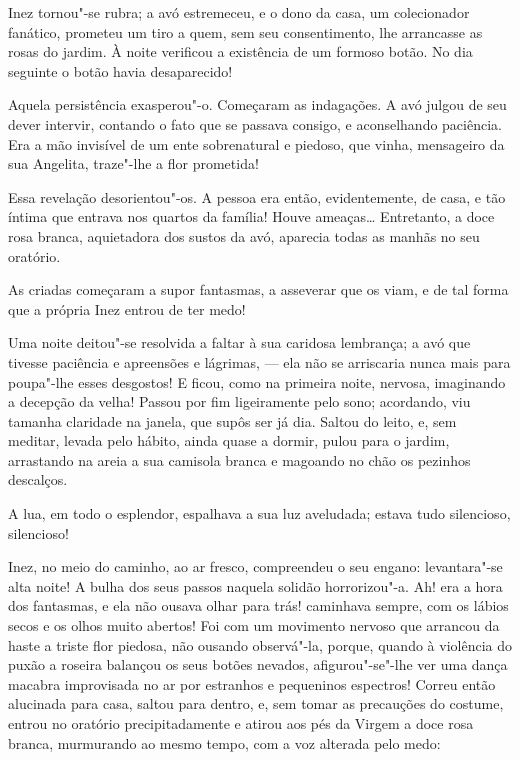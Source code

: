 Inez tornou"-se rubra; a avó estremeceu, e o dono da casa, um
colecionador fanático, prometeu um tiro a quem, sem seu consentimento,
lhe arrancasse as rosas do jardim. À noite verificou a existência de um
formoso botão. No dia seguinte o botão havia desaparecido!

Aquela persistência exasperou"-o. Começaram as indagações. A avó julgou
de seu dever intervir, contando o fato que se passava consigo, e
aconselhando paciência. Era a mão invisível de um ente sobrenatural e
piedoso, que vinha, mensageiro da sua Angelita, traze"-lhe a flor
prometida!

Essa revelação desorientou"-os. A pessoa era então, evidentemente, de
casa, e tão íntima que entrava nos quartos da família! Houve ameaças\ldots{}
Entretanto, a doce rosa branca, aquietadora dos sustos da avó, aparecia
todas as manhãs no seu oratório.

As criadas começaram a supor fantasmas, a asseverar que os viam, e de
tal forma que a própria Inez entrou de ter medo!

Uma noite deitou"-se resolvida a faltar à sua caridosa lembrança; a avó
que tivesse paciência e apreensões e lágrimas, --- ela não se arriscaria
nunca mais para poupa"-lhe esses desgostos! E ficou, como na primeira
noite, nervosa, imaginando a decepção da velha! Passou por fim
ligeiramente pelo sono; acordando, viu tamanha claridade na janela, que
supôs ser já dia. Saltou do leito, e, sem meditar, levada pelo hábito,
ainda quase a dormir, pulou para o jardim, arrastando na areia a sua
camisola branca e magoando no chão os pezinhos descalços.

A lua, em todo o esplendor, espalhava a sua luz aveludada; estava tudo
silencioso, silencioso!

Inez, no meio do caminho, ao ar fresco, compreendeu o seu engano:
levantara"-se alta noite! A bulha dos seus passos naquela solidão
horrorizou"-a. Ah! era a hora dos fantasmas, e ela não ousava olhar para
trás! caminhava sempre, com os lábios secos e os olhos muito abertos!
Foi com um movimento nervoso que arrancou da haste a triste flor
piedosa, não ousando observá"-la, porque, quando à violência do puxão a
roseira balançou os seus botões nevados, afigurou"-se"-lhe ver uma dança
macabra improvisada no ar por estranhos e pequeninos espectros! Correu
então alucinada para casa, saltou para dentro, e, sem tomar as
precauções do costume, entrou no oratório precipitadamente e atirou aos
pés da Virgem a doce rosa branca, murmurando ao mesmo tempo, com a voz
alterada pelo medo:

